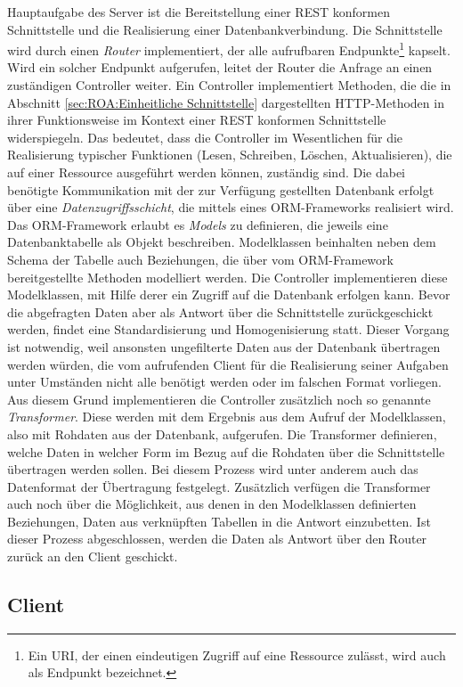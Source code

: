 Hauptaufgabe des Server ist die Bereitstellung einer REST konformen Schnittstelle und die Realisierung einer Datenbankverbindung. Die Schnittstelle wird durch einen \emph{Router} implementiert, der alle aufrufbaren Endpunkte\footnote{Ein \acf{URI}, der einen eindeutigen Zugriff auf eine Ressource zulässt, wird auch als Endpunkt bezeichnet.} kapselt. Wird ein solcher Endpunkt aufgerufen, leitet der Router die Anfrage an einen zuständigen Controller weiter. Ein Controller implementiert Methoden, die die in Abschnitt \ref{sec:ROA:Einheitliche Schnittstelle} dargestellten HTTP-Methoden in ihrer Funktionsweise im Kontext einer REST konformen Schnittstelle widerspiegeln. Das bedeutet, dass die Controller im Wesentlichen für die Realisierung typischer Funktionen (Lesen, Schreiben, Löschen, Aktualisieren), die auf einer Ressource ausgeführt werden können, zuständig sind. Die dabei benötigte Kommunikation mit der zur Verfügung gestellten Datenbank erfolgt über eine \emph{Datenzugriffsschicht}, die mittels eines ORM-Frameworks realisiert wird. Das ORM-Framework erlaubt es \emph{Models} zu definieren, die jeweils eine Datenbanktabelle als Objekt beschreiben. Modelklassen beinhalten neben dem Schema der Tabelle auch Beziehungen, die über vom ORM-Framework bereitgestellte Methoden modelliert werden. Die Controller implementieren diese Modelklassen, mit Hilfe derer ein Zugriff auf die Datenbank erfolgen kann. Bevor die abgefragten Daten aber als Antwort über die Schnittstelle zurückgeschickt werden, findet eine Standardisierung und Homogenisierung statt. Dieser Vorgang ist notwendig, weil ansonsten ungefilterte Daten aus der Datenbank übertragen werden würden, die vom aufrufenden Client für die Realisierung seiner Aufgaben unter Umständen nicht alle benötigt werden oder im falschen Format vorliegen. Aus diesem Grund implementieren die Controller zusätzlich noch so genannte \emph{Transformer}. Diese werden mit dem Ergebnis aus dem Aufruf der Modelklassen, also mit Rohdaten aus der Datenbank, aufgerufen. Die Transformer definieren, welche Daten in welcher Form im Bezug auf die Rohdaten über die Schnittstelle übertragen werden sollen. Bei diesem Prozess wird unter anderem auch das Datenformat der Übertragung festgelegt. Zusätzlich verfügen die Transformer auch noch über die Möglichkeit, aus denen in den Modelklassen definierten Beziehungen, Daten aus verknüpften Tabellen in die Antwort einzubetten. Ist dieser Prozess abgeschlossen, werden die Daten als Antwort über den Router zurück an den Client geschickt.

\subsection{Client}
\label{sec:Entwurf:Client}

